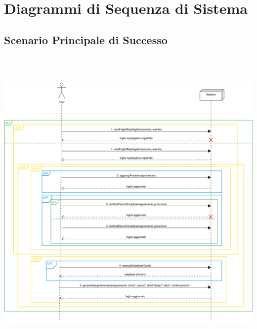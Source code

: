 \chapter{Diagrammi di Sequenza di Sistema}
\centering
\section*{Scenario Principale di Successo}
\includegraphics[max width=\textwidth, max height=158mm]{../resources/img/GCC/SSD/main.png}

